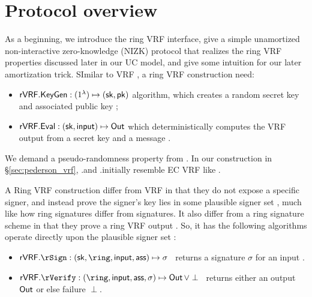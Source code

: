 \vspace{-3mm}
\section{Protocol overview}
\label{sec:overview}

As a beginning, we introduce the ring VRF interface, give a simple
unamortized non-interactive zero-knowledge (NIZK) protocol that
realizes the ring VRF properties discussed later in our UC model,
and give some intuition for our later amortization trick.
SImilar to VRF \cite{vrf_micali}, a ring VRF construction need: 
\begin{itemize}
	\item ${\mathsf{rVRF}}.{\mathsf{KeyGen}} : (1^{\lambda}) \mapsto (\mathsf{sk}, \mathsf{pk})$ algorithm,
	which creates a random secret key \sk and associated public key \pk;
	
	\item ${\mathsf{rVRF}}.{\mathsf{Eval}} : (\mathsf{sk},\mathsf{input}) \mapsto {\ensuremath{\mathsf{Out}}}$ which deterministically computes the VRF output \Out from a secret key \sk and a message \msg.
\end{itemize}
%

We demand a pseudo-randomness property from \Eval. In our construction in \S\ref{sec:pederson_vrf},  \rVRF.\KeyGen and \rVRF.\Eval initially resemble EC VRF like \cite{nsec5,VXEd25519,draft-irtf-cfrg-vrf-10}.


A Ring VRF construction differ from VRF in that they do not expose a specific signer,
and instead prove the signer's key lies in some plausible signer set \ring,
much like how ring signatures differ from signatures.
It also differ from a ring signature scheme in that they prove a ring VRF output \Out.
So, it has the following algorithms operate directly upon
the plausible signer set \ring:
\begin{itemize}
	\item $\rVRF.\rSign : (\sk,\ring,\msg,\aux) \mapsto \sigma$ \,
	returns a signature $\sigma$ for an input \msg.
	\item $\rVRF.\rVerify : (\ring,\msg,\aux,\sigma) \mapsto \Out \, \lor \perp$ \,
	returns either an output ${\mathsf{Out}}$ or else failure $\perp$.
\end{itemize}

